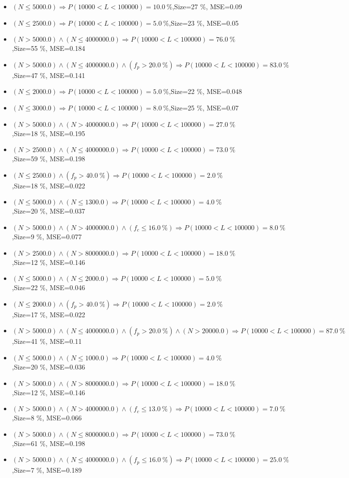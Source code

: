 \documentclass[numbered]{CSL}
\begin{document}
\begin{itemize}
\item $(N \leq 5000.0) \Rightarrow P(10 000 < L < 100 000) = 10.0~\%$,\hfill Size=27 \%, MSE=0.09
\item $(N \leq 2500.0) \Rightarrow P(10 000 < L < 100 000) = 5.0~\%$,\hfill Size=23 \%, MSE=0.05
\item $(N > 5000.0) \land (N \leq 4000000.0) \Rightarrow P(10 000 < L < 100 000) = 76.0~\%$,\hfill Size=55 \%, MSE=0.184
\item $(N > 5000.0) \land (N \leq 4000000.0) \land (f_p > 20.0~\%) \Rightarrow P(10 000 < L < 100 000) = 83.0~\%$,\hfill Size=47 \%, MSE=0.141
\item $(N \leq 2000.0) \Rightarrow P(10 000 < L < 100 000) = 5.0~\%$,\hfill Size=22 \%, MSE=0.048
\item $(N \leq 3000.0) \Rightarrow P(10 000 < L < 100 000) = 8.0~\%$,\hfill Size=25 \%, MSE=0.07
\item $(N > 5000.0) \land (N > 4000000.0) \Rightarrow P(10 000 < L < 100 000) = 27.0~\%$,\hfill Size=18 \%, MSE=0.195
\item $(N > 2500.0) \land (N \leq 4000000.0) \Rightarrow P(10 000 < L < 100 000) = 73.0~\%$,\hfill Size=59 \%, MSE=0.198
\item $(N \leq 2500.0) \land (f_p > 40.0~\%) \Rightarrow P(10 000 < L < 100 000) = 2.0~\%$,\hfill Size=18 \%, MSE=0.022
\item $(N \leq 5000.0) \land (N \leq 1300.0) \Rightarrow P(10 000 < L < 100 000) = 4.0~\%$,\hfill Size=20 \%, MSE=0.037
\item $(N > 5000.0) \land (N > 4000000.0) \land (f_c \leq 16.0~\%) \Rightarrow P(10 000 < L < 100 000) = 8.0~\%$,\hfill Size=9 \%, MSE=0.077
\item $(N > 2500.0) \land (N > 8000000.0) \Rightarrow P(10 000 < L < 100 000) = 18.0~\%$,\hfill Size=12 \%, MSE=0.146
\item $(N \leq 5000.0) \land (N \leq 2000.0) \Rightarrow P(10 000 < L < 100 000) = 5.0~\%$,\hfill Size=22 \%, MSE=0.046
\item $(N \leq 2000.0) \land (f_p > 40.0~\%) \Rightarrow P(10 000 < L < 100 000) = 2.0~\%$,\hfill Size=17 \%, MSE=0.022
\item $(N > 5000.0) \land (N \leq 4000000.0) \land (f_p > 20.0~\%) \land (N > 20000.0) \Rightarrow P(10 000 < L < 100 000) = 87.0~\%$,\hfill Size=41 \%, MSE=0.11
\item $(N \leq 5000.0) \land (N \leq 1000.0) \Rightarrow P(10 000 < L < 100 000) = 4.0~\%$,\hfill Size=20 \%, MSE=0.036
\item $(N > 5000.0) \land (N > 8000000.0) \Rightarrow P(10 000 < L < 100 000) = 18.0~\%$,\hfill Size=12 \%, MSE=0.146
\item $(N > 5000.0) \land (N > 4000000.0) \land (f_c \leq 13.0~\%) \Rightarrow P(10 000 < L < 100 000) = 7.0~\%$,\hfill Size=8 \%, MSE=0.066
\item $(N > 5000.0) \land (N \leq 8000000.0) \Rightarrow P(10 000 < L < 100 000) = 73.0~\%$,\hfill Size=61 \%, MSE=0.198
\item $(N > 5000.0) \land (N \leq 4000000.0) \land (f_p \leq 16.0~\%) \Rightarrow P(10 000 < L < 100 000) = 25.0~\%$,\hfill Size=7 \%, MSE=0.189
\end{itemize}
\end{document}
